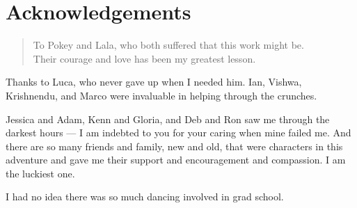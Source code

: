 \chapter{Acknowledgements}

\begin{quote}
To Pokey and Lala,
who both suffered that this work might be.\\
Their courage and love has been my greatest lesson.
\end{quote}


Thanks to Luca, who never gave up when I needed him.
Ian, Vishwa, Krishnendu, and Marco were invaluable in
helping through the crunches.

Jessica and Adam, Kenn and Gloria, and Deb and Ron
saw me through the darkest hours --- I am indebted to you
for your caring when mine failed me.
And there are so many friends and family, new and old,
that were characters in this adventure and gave me their
support and encouragement and compassion.
I am the luckiest one.

I had no idea there was so much dancing involved in grad school.

